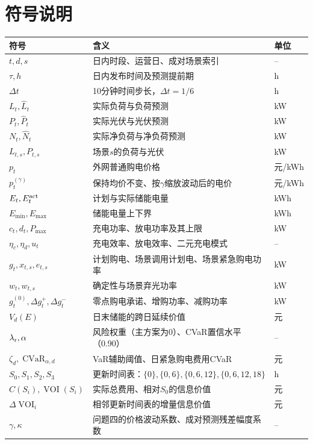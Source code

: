 \section{符号说明}

\begin{table}[H]
\centering\small
\renewcommand{\arraystretch}{1.07}
\begin{tabularx}{\textwidth}{lXl}
\toprule 符号 & 含义 & 单位\\\midrule
$t,d,s$ & 日内时段、运营日、成对场景索引 & --\\
$\tau,h$ & 日内发布时间及预测提前期 & h\\
$\Delta t$ & 10分钟时间步长，$\Delta t=1/6$ & h\\
$L_t,\widehat L_t$ & 实际负荷与负荷预测 & kW\\
$P_t,\widehat P_t$ & 实际光伏与光伏预测 & kW\\
$N_t,\widehat N_t$ & 实际净负荷与净负荷预测 & kW\\
$L_{t,s},P_{t,s}$ & 场景$s$的负荷与光伏 & kW\\
$p_t$ & 外网普通购电价格 & 元/kWh\\
$p_t^{(\gamma)}$ & 保持均价不变、按$\gamma$缩放波动后的电价 & 元/kWh\\
$E_t,E_t^{\rm act}$ & 计划与实际储能电量 & kWh\\
$E_{\min},E_{\max}$ & 储能电量上下界 & kWh\\
$c_t,d_t,P_{\max}$ & 充电功率、放电功率及其上限 & kW\\
$\eta_c,\eta_d,u_t$ & 充电效率、放电效率、二元充电模式 & --\\
$g_t,x_{t,s},e_{t,s}$ & 计划购电、场景调用计划电、场景紧急购电功率 & kW\\
$w_t,w_{t,s}$ & 确定性与场景弃光功率 & kW\\
$g_t^{(0)},\Delta g_t^+,\Delta g_t^-$ & 零点购电承诺、增购功率、减购功率 & kW\\
$V_d(E)$ & 日末储能的跨日延续价值 & 元\\
$\lambda_{\rm r},\alpha$ & 风险权重（主方案为0）、CVaR置信水平（0.90） & --\\
$\zeta_d,\operatorname{CVaR}_{\alpha,d}$ & VaR辅助阈值、日紧急购电费用CVaR & 元\\
$S_0,S_1,S_2,S_3$ & 更新时间表：$\{0\},\{0,6\},\{0,6,12\},\{0,6,12,18\}$ & h\\
$C(S_i),\operatorname{VOI}(S_i)$ & 实际总费用、相对$S_0$的信息价值 & 元\\
$\Delta\operatorname{VOI}_i$ & 相邻更新时间表的增量信息价值 & 元\\
$\gamma,\kappa$ & 问题四的价格波动系数、成对预测残差幅度系数 & --\\
\bottomrule
\end{tabularx}
\end{table}
